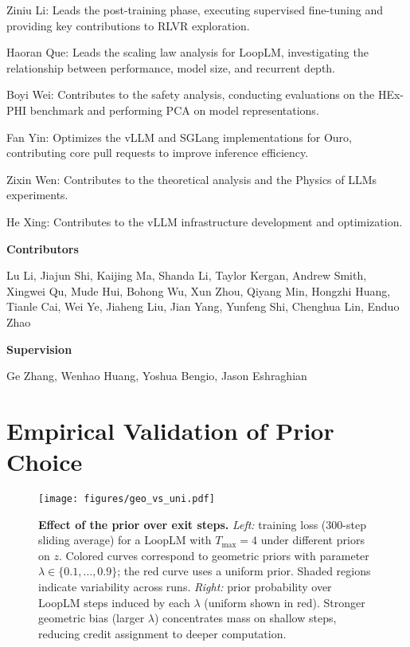 \documentclass[]{bytedance_seed}
\newcommand{\1}{\mathbf{1}}
\newcommand{\ut}{LoopLM}
\begin{document}
Ziniu Li: Leads the post-training phase, executing supervised fine-tuning and providing key contributions to RLVR exploration.

Haoran Que: Leads the scaling law analysis for \ut{}, investigating the relationship between performance, model size, and recurrent depth.

Boyi Wei: Contributes to the safety analysis, conducting evaluations on the HEx-PHI benchmark and performing PCA on model representations.

Fan Yin: Optimizes the vLLM and SGLang implementations for Ouro, contributing core pull requests to improve inference efficiency.

Zixin Wen: Contributes to the theoretical analysis and the Physics of LLMs experiments.

He Xing: Contributes to the vLLM infrastructure development and optimization.

\textbf{Contributors}

Lu Li, Jiajun Shi, Kaijing Ma, Shanda Li, Taylor Kergan, Andrew Smith, Xingwei Qu, Mude Hui, Bohong Wu, Xun Zhou, Qiyang Min, Hongzhi Huang, Tianle Cai, Wei Ye, Jiaheng Liu, Jian Yang, Yunfeng Shi, Chenghua Lin, Enduo Zhao

\textbf{Supervision}

Ge Zhang, Wenhao Huang, Yoshua Bengio, Jason Eshraghian





\newpage
\appendix
\section{Empirical Validation of Prior Choice}
\label{app:prior_empirical}

\begin{figure}[htbp]
    \centering
    \texttt{[image: figures/geo\_vs\_uni.pdf]}
    \vspace{-0.6em}
    \caption{\textbf{Effect of the prior over exit steps.} 
    \emph{Left:} training loss (300-step sliding average) for a \ut{} with $T_{\max}=4$ under different priors on $z$. 
    Colored curves correspond to geometric priors with parameter $\lambda\in\{0.1,\dots,0.9\}$; the red curve uses a uniform prior. 
    Shaded regions indicate variability across runs. 
    \emph{Right:} prior probability over \ut{} steps induced by each $\lambda$ (uniform shown in red). 
    Stronger geometric bias (larger $\lambda$) concentrates mass on shallow steps, reducing credit assignment to deeper computation.}
    \label{fig:prior_loss}
\end{figure}
\end{document}
